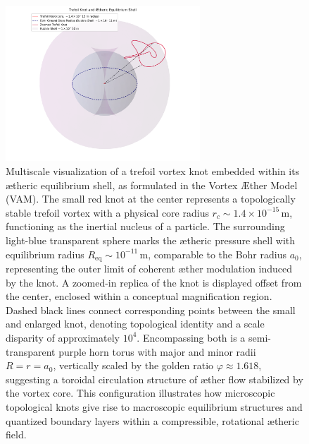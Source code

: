 \begin{figure}[h!]
    \centering
    \includegraphics[width=0.65\textwidth]{images/PressureProfileAroundCore3}
    \caption{Multiscale visualization of a trefoil vortex knot embedded within its ætheric equilibrium shell, as formulated in the Vortex Æther Model (VAM).
    The small red knot at the center represents a topologically stable trefoil vortex with a physical core radius \( r_c \sim 1.4 \times 10^{-15}\,\mathrm{m} \), functioning as the inertial nucleus of a particle.
    The surrounding light-blue transparent sphere marks the ætheric pressure shell with equilibrium radius \( R_{\text{eq}} \sim 10^{-11}\,\mathrm{m} \), comparable to the Bohr radius \( a_0 \), representing the outer limit of coherent æther modulation induced by the knot.
    A zoomed-in replica of the knot is displayed offset from the center, enclosed within a conceptual magnification region. Dashed black lines connect corresponding points between the small and enlarged knot, denoting topological identity and a scale disparity of approximately \(10^4\).
    Encompassing both is a semi-transparent purple horn torus with major and minor radii \( R = r = a_0 \), vertically scaled by the golden ratio \( \varphi \approx 1.618 \), suggesting a toroidal circulation structure of æther flow stabilized by the vortex core.
    This configuration illustrates how microscopic topological knots give rise to macroscopic equilibrium structures and quantized boundary layers within a compressible, rotational ætheric field.}
\end{figure}

